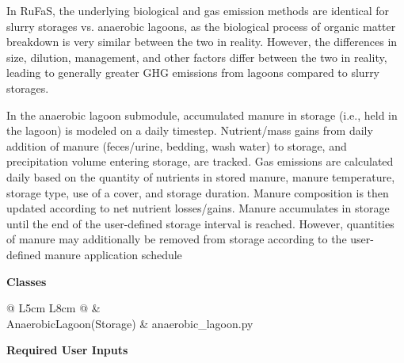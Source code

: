 \begin{refsection}
    In RuFaS, the underlying biological and gas emission methods are identical for slurry storages vs. anaerobic lagoons, as the biological process of organic matter breakdown is very similar between the two in reality. However, the differences in size, dilution, management, and other factors differ between the two in reality, leading to generally greater GHG emissions from lagoons compared to slurry storages.
    
    In the anaerobic lagoon submodule, accumulated manure in storage (i.e., held in the lagoon) is modeled on a daily timestep. Nutrient/mass gains from daily addition of manure (feces/urine, bedding, wash water) to storage, and precipitation volume entering storage, are tracked. Gas emissions are calculated daily based on the quantity of nutrients in stored manure, manure temperature, storage type, use of a cover, and storage duration. Manure composition is then updated according to net nutrient losses/gains. Manure accumulates in storage until the end of the user-defined storage interval is reached. However, quantities of manure may additionally be removed from storage according to the user-defined manure application schedule
    \vspace{0.2cm}

\newpage
\textbf{Classes}
\vspace{0.2cm}

    \begin{table}[h!]
    \centering
    \caption{List of Python classes for anaerobic lagoon.}
    \renewcommand{\arraystretch}{1.3}

    \begin{tabular}{@{} L{5cm} L{8cm}  @{}}
    \toprule
     & 
     \\
    \midrule
    AnaerobicLagoon(Storage)  & anaerobic\_lagoon.py \\
    \bottomrule
    \end{tabular}
    \end{table}  
\vspace{ 0.25cm}

    \textbf{Required User Inputs }
    \vspace{ 0.25cm}


    \begin{table}[h!]
    \centering
    \renewcommand{\arraystretch}{1.3}
    
    \begin{center}
        \caption{Required inputs for the anaerobic lagoon section (refreshed\_manure\_management.json)}
    \end{center}
    \vspace{-0.1cm}
    

\end{table}
\end{refsection}
